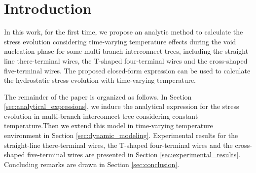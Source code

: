 \section{Introduction}
\label{sec:introduction}

In this work, for the first time, we propose an analytic method to calculate the stress evolution considering time-varying temperature effects during the void nucleation phase for some multi-branch interconnect trees, including the straight-line there-terminal wires, the T-shaped four-terminal wires and the cross-shaped five-terminal wires. The proposed closed-form expression can be used to calculate the hydrostatic stress evolution with time-varying temperature.

The remainder of the paper is organized as follows. In Section \ref{sec:analytical_expressions}, we induce the analytical expression for the stress evolution in multi-branch interconnect tree considering constant temperature.Then we extend this model in time-varying temperature environment in Section \ref{sec:dynamic_modeling}. Experimental results for the straight-line there-terminal wires, the T-shaped four-terminal wires and the cross-shaped five-terminal wires are presented in Section \ref{sec:experimental_results}. Concluding remarks are drawn in Section \ref{sec:conclusion}.



